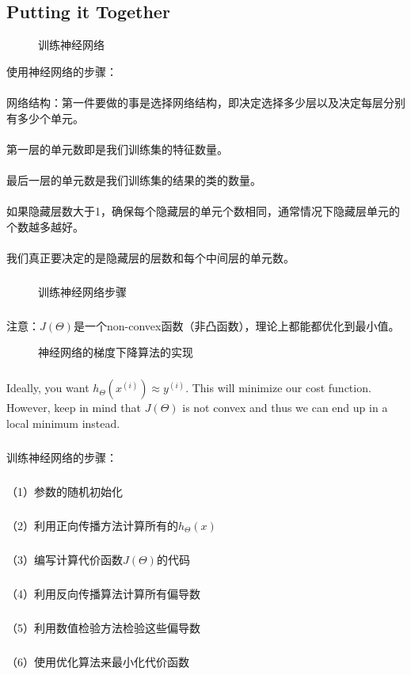 \documentclass{article}
\begin{document}
\begin{CJK}{UTF8}{gbsn}
\subsection{Putting it Together}
\begin{figure}[H]
\caption{训练神经网络}
\label{fig:560}
\end{figure}
使用神经网络的步骤：
\paragraph{}
网络结构：第一件要做的事是选择网络结构，即决定选择多少层以及决定每层分别有多少个单元。
\paragraph{}
第一层的单元数即是我们训练集的特征数量。
\paragraph{}
最后一层的单元数是我们训练集的结果的类的数量。
\paragraph{}
如果隐藏层数大于1，确保每个隐藏层的单元个数相同，通常情况下隐藏层单元的个数越多越好。
\paragraph{}
我们真正要决定的是隐藏层的层数和每个中间层的单元数。
\subparagraph{}
\begin{figure}[H]
\label{fig:561}
\end{figure}
\begin{figure}[H]
\caption{训练神经网络步骤}
\label{fig:562}
\end{figure}
\subparagraph{}
注意：$J(\Theta)$是一个non-convex函数（非凸函数），理论上都能都优化到最小值。
\begin{figure}[H]
\caption{神经网络的梯度下降算法的实现}
\label{fig:570}
\end{figure}
\subparagraph{}
Ideally, you want $h_\Theta(x^{(i)})\approx{y^{(i)}}$. This will minimize our cost function. However, keep in mind that $J(\Theta)$ is not convex and thus we can end up in a local minimum instead. 
\begin{figure}[H]
\label{fig:571}
\end{figure}
\subparagraph{}
训练神经网络的步骤：
\subparagraph{}
（1）参数的随机初始化
\subparagraph{}
（2）利用正向传播方法计算所有的$h_\Theta(x)$
\subparagraph{}
（3）编写计算代价函数$J(\Theta)$的代码
\subparagraph{}
（4）利用反向传播算法计算所有偏导数
\subparagraph{}
（5）利用数值检验方法检验这些偏导数
\subparagraph{}
（6）使用优化算法来最小化代价函数

\end{CJK}
\end{document}
